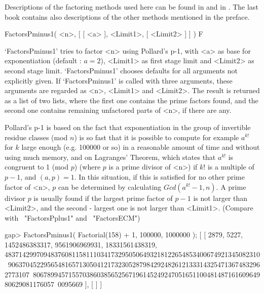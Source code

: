 

Descriptions of the factoring methods used here can be found in
\cite{FactorizationAndPrimalityTesting} and in
\cite{ComputationalAlgebraicNumberTheory}.
The last book contains also descriptions of the other methods mentioned
in the preface.

 
\>FactorsPminus1( <n>, [ [ <a> ], <Limit1>, [ <Limit2> ] ] ) F

`FactorsPminus1' tries to factor <n> using Pollard's p-1, with <a>
as base for exponentiation (default : $a=2$), 
<Limit1> as first stage limit and <Limit2> as second stage limit.
`FactorsPminus1' chooses defaults for all arguments not explicitly given.
If `FactorsPminus1' is called with three arguments, these arguments
are regarded as <n>, <Limit1> and <Limit2>.
The result is returned as a list of two lists, where the first one 
contains the prime factors found, and the second one contains
remaining unfactored parts of <n>, if there are any.

Pollard's p-1 is based on the fact that exponentiation in the
group of invertible residue classes (mod $n$) is so fast that
it is possible to compute for example $a^{k!}$ for $k$ large enough
(e.g. 100000 or so) in a reasonable amount of time and without
using much memory, and on 
Lagranges' Theorem,
which states that $a^{k!}$ is congruent to 1 (mod $p$) 
(where $p$ is a prime divisor of <n>) if $k!$ is a multiple of $p-1$,
and $(a,p)=1$.
In this situation, if this is satisfied for no other
prime factor of <n>, $p$ can be determined by 
calculating $Gcd(a^{k!}-1,n)$.
A prime divisor $p$ is usually found if the largest prime factor
of $p-1$ is not larger than <Limit2>, and the second - largest one
is not larger than <Limit1>.
(Compare with ~"FactorsPplus1" and ~"FactorsECM")

\beginexample
gap> FactorsPminus1( Factorial(158) + 1, 100000, 1000000 );
[ [ 2879, 5227, 1452486383317, 9561906969931, 18331561438319, 
      483714299709483760811581110341732950506493218122654853400674921345082310\
906370452295654816571305041217323052879842924826121333143254713674832962773107\
806789945715570386038565256719614524924705165110048148716160964980629081176057\
0095669 ], [  ] ]

